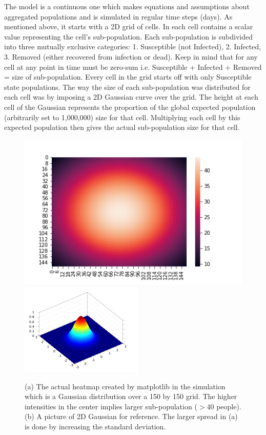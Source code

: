 \documentclass[a4paper]{article}
\begin{document}
The model is a continuous one which makes equations and assumptions about aggregated 
populations and is simulated in regular time steps (days). As mentioned above, it starts with 
a 2D grid of cells. In each cell contains a scalar value representing the cell's
sub-population. Each sub-population is subdivided into three mutually exclusive
categories: 1. Susceptible (not Infected), 2. Infected, 3. Removed (either
recovered from infection or dead). Keep in mind that for any cell at any
point in time must be zero-sum i.e. Susceptible + Infected + Removed = size of
sub-population. Every cell in the grid starts off with only Susceptible
state populations. The way the size of each sub-population was distributed for each cell was
by imposing a 2D Gaussian curve over the grid. The height at each cell
of the Gaussian represents the proportion of the global expected population (arbitrarily
set to 1,000,000) size for that cell. Multiplying each cell by this expected population then 
gives the actual sub-population size for that cell.

\begin{figure}[ht]
  \includegraphics[scale=0.4]{../population_dist.png}
  \includegraphics[scale=0.7]{../2dgauss.png}
  \centering
  \caption{(a) The actual heatmap created by matplotlib in the simulation 
    which is a Gaussian distribution over a 150 by 150 grid. The higher intensities
  in the center implies larger sub-population ($> 40$ people). (b) A picture of
2D Gaussian for reference. The larger spread in (a) is done by increasing the
standard deviation. }
\end{figure}
\end{document}
